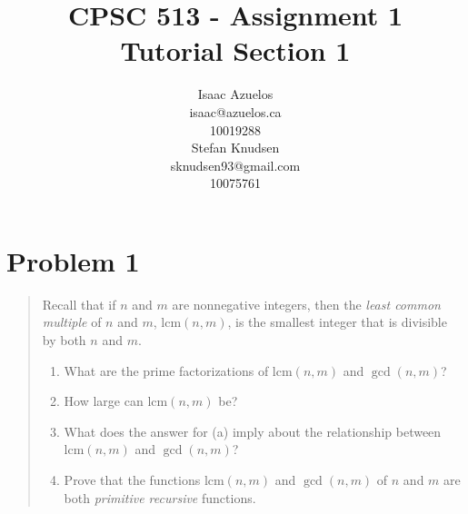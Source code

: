 \documentclass{article}
\newcommand{\lcm}{\mathrm{lcm}}
\begin{document}
\pagestyle{empty}

\title{CPSC 513 - Assignment 1 \\ Tutorial Section 1}
\author{
  \begin{minipage}{0.4\textwidth}
  \begin{flushleft}
  Isaac Azuelos\\
  isaac@azuelos.ca\\
  10019288
  \end{flushleft}
  \end{minipage}
  \begin{minipage}{0.4\textwidth}
  \begin{flushright}
  Stefan Knudsen \\
  sknudsen93@gmail.com \\
  10075761\\
  \end{flushright}
  \end{minipage}
}
\maketitle

\section*{Problem 1}

\begin{quote}
  Recall that if $n$ and $m$ are nonnegative integers, then the
  \textit{least common multiple} of $n$ and $m$, $\lcm(n, m)$, is the
  smallest integer that is divisible by both $n$ and $m$.

  \begin{enumerate}[label=\alph*)]
    \item What are the prime factorizations of $\lcm(n, m)$ and
      $\gcd(n, m)$?
    \item How large can $\lcm(n, m)$ be?
    \item What does the answer for (a) imply about the relationship
      between $\lcm(n, m)$ and $\gcd(n, m)$?
    \item Prove that the functions $\lcm(n, m)$ and $\gcd(n, m)$ of
      $n$ and $m$ are both \textit{primitive recursive} functions.
  \end{enumerate}
\end{quote}
\end{document}
